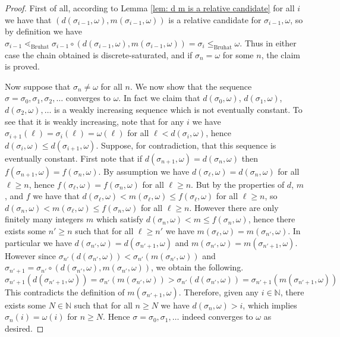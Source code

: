\documentclass[oneside,11pt,reqno]{amsart}
\newcommand{\nn}{\ensuremath{\mathbb{N}}}
\theoremstyle{definition}
\newtheorem{proof techniques}{Proof Techniques}
\begin{document}
\begin{proof}
First of all, according to Lemma \ref{lem: d m is a relative candidate} for all $i$ we have that $(d(\sigma_{i - 1}, \omega), m(\sigma_{i - 1},\omega))$ is a relative candidate for $\sigma_{i - 1},\omega$, so by definition we have $\sigma_{i - 1} \lessdot_\text{Bruhat} \sigma_{i - 1} \circ (d(\sigma_{i - 1}, \omega), m(\sigma_{i - 1},\omega)) = \sigma_i \leq_\text{Bruhat} \omega$. Thus in either case the chain obtained is discrete-saturated, and if $\sigma_n = \omega$ for some $n$, the claim is proved.  

Now suppose that $\sigma_n \neq \omega$ for all $n$. We now show that the sequence $\sigma = \sigma_0, \sigma_1, \sigma_2, \ldots$ converges to $\omega$. In fact we claim that $d(\sigma_0 , \omega)$, $d(\sigma_1 , \omega)$, $d(\sigma_2 , \omega), \ldots$ is a weakly increasing sequence which is not eventually constant. To see that it is weakly increasing, note that for any $i$ we have $\sigma_{i + 1}(\ell) = \sigma_i(\ell) = \omega(\ell)$ for all $\ell < d(\sigma_i , \omega)$, hence $d(\sigma_i , \omega) \leq d(\sigma_{i + 1} , \omega)$. Suppose, for contradiction, that this sequence is eventually constant. First note that if $d(\sigma_{n + 1} , \omega) = d(\sigma_{n}, \omega)$ then $f(\sigma_{n + 1} , \omega) = f(\sigma_{n} , \omega)$. By assumption we have $d(\sigma_\ell , \omega) =  d(\sigma_{n} , \omega)$ for all $\ell \geq n$, hence $f(\sigma_\ell , \omega) = f(\sigma_n , \omega)$ for all $\ell \geq n$. But by the properties of $d$, $m$, and $f$ we have that $d(\sigma_\ell , \omega) < m(\sigma_\ell , \omega) \leq f(\sigma_\ell , \omega)$ for all $\ell \geq n$, so $d(\sigma_n , \omega) < m(\sigma_\ell , \omega) \leq f(\sigma_n, \omega)$ for all $\ell \geq n$. However there are only finitely many integers $m$ which satisfy $d(\sigma_n , \omega) < m \leq f(\sigma_n, \omega)$, hence there exists some $n' \geq n$ such that for all $\ell \geq n'$ we have $m(\sigma_\ell , \omega) = m(\sigma_{n'} , \omega)$. In particular we have $d(\sigma_{n'} , \omega) = d(\sigma_{n' + 1} , \omega)$ and $m(\sigma_{n'} , \omega) = m(\sigma_{n' + 1} , \omega)$. However since $\sigma_{n'} (d(\sigma_{n'} , \omega) ) < \sigma_{n'} (m(\sigma_{n'} , \omega) )$ and $\sigma_{n' + 1} = \sigma_{n'} \circ (d(\sigma_{n'} , \omega) , m(\sigma_{n'} , \omega) )$, we obtain the following. 
\begin{equation*}
    \sigma_{n' + 1}( d(\sigma_{n' + 1} , \omega) ) = \sigma_{n'}( m(\sigma_{n'} , \omega) ) > \sigma_{n'}( d(\sigma_{n'} , \omega) ) = \sigma_{n' + 1}( m(\sigma_{n' + 1} , \omega) )
\end{equation*}
This contradicts the definition of $m(\sigma_{n' + 1} , \omega)$. Therefore, given any $i \in \nn$, there exists some $N \in \nn$ such that for all $n \geq N$ we have $d(\sigma_n , \omega) > i$, which implies $\sigma_n(i) = \omega(i)$ for $n \geq N$. Hence $\sigma = \sigma_0 , \sigma_1, \ldots$ indeed converges to $\omega$ as desired. 
\end{proof}
\end{document}
